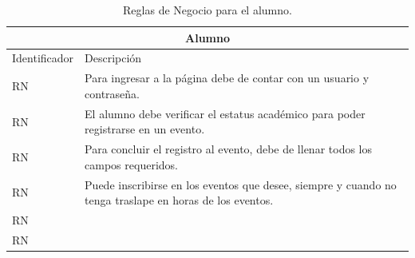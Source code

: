 \pagebreak

\begin{table}[hbt!]
	\begin{center}
		\begin{tabular}{|p{30mm}|p{100mm}|}
			\hline
			\multicolumn{2}{|c|}{Alumno} \\ \hline
			Identificador & Descripción \\ \hline 
			RN & Para ingresar a la página debe de contar con un usuario y contraseña.\\ \hline
			RN & El alumno debe verificar el estatus académico para poder registrarse en un evento.\\ \hline
			RN & Para concluir el registro al evento, debe de llenar todos los campos requeridos.\\ \hline
			RN & Puede inscribirse en los eventos que desee, siempre y cuando no tenga traslape en horas de los eventos.\\ \hline
			RN & \\ \hline
			RN & \\ \hline
		\end{tabular}
		\caption{Reglas de Negocio para el alumno.}
		\label{RNA}
	\end{center}
\end{table}


